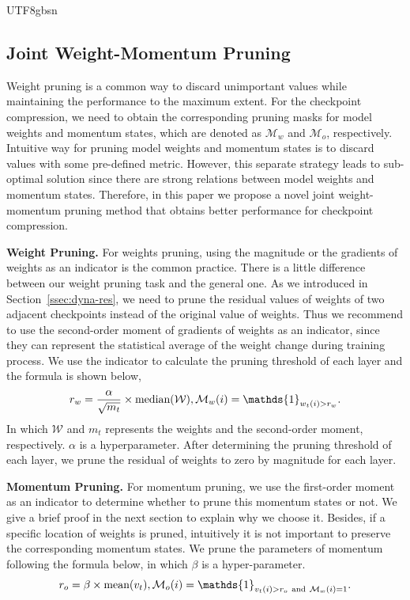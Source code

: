 \documentclass{article}
\theoremstyle{plain}
\theoremstyle{definition}
\theoremstyle{remark}
\begin{document}
\begin{CJK}{UTF8}{gbsn}
\subsection{Joint Weight-Momentum Pruning}
\label{ssec:joint-pruning}

Weight pruning is a common way to discard unimportant values while maintaining the performance to the maximum extent. For the checkpoint compression, we need to obtain the corresponding pruning masks for model weights and momentum states, which are denoted as $\mathcal{M}_w$ and $\mathcal{M}_o$, respectively.
Intuitive way for pruning model weights and momentum states is to discard values with some pre-defined metric. However, this separate strategy leads to sub-optimal solution since there are strong relations between model weights and momentum states. Therefore, in this paper we propose a novel joint weight-momentum pruning method that obtains better performance for checkpoint compression.

\textbf{Weight Pruning.} For weights pruning, using the magnitude or the gradients of weights as an indicator is the common practice. There is a little difference between our weight pruning task and the general one. As we introduced in Section~\ref{ssec:dyna-res}, we need to prune the residual values of weights of two adjacent checkpoints instead of the original value of weights. Thus we recommend to use the second-order moment of gradients of weights as an indicator, since they can represent the statistical average of the weight change during training process. We use the indicator to calculate the pruning threshold of each layer and the formula is shown below,
\begin{equation}
\label{eqa:rw}
	r_w = \frac{\alpha}{\sqrt{m_t}} \times \text{median}(\mathcal{W}),\\
	\mathcal{M}_w(i) = \mathds{1}_{w_{t}(i) > r_w}.
\end{equation}
In which $\mathcal{W}$ and $m_t$ represents the weights and the second-order moment, respectively. $\alpha$ is a hyperparameter. After determining the pruning threshold of each layer, we prune the residual of weights to zero by magnitude for each layer.

\textbf{Momentum Pruning.} For momentum pruning, we use the first-order moment as an indicator to determine whether to prune this momentum states or not. We give a brief proof in the next section to explain why we choose it.  Besides, if a specific location of weights is pruned, intuitively it is not important to preserve the corresponding momentum states. We prune the parameters of momentum following the formula below, in which $\beta$ is a hyper-parameter.
\begin{equation}
\label{eqa:ro}
	r_o = \beta \times \text{mean}(v_t),\\
	\mathcal{M}_o(i) = \mathds{1}_{v_{t}(i) > r_o~\text{and}~\mathcal{M}_w(i)=1}.
\end{equation}


\end{CJK}
\end{document}
